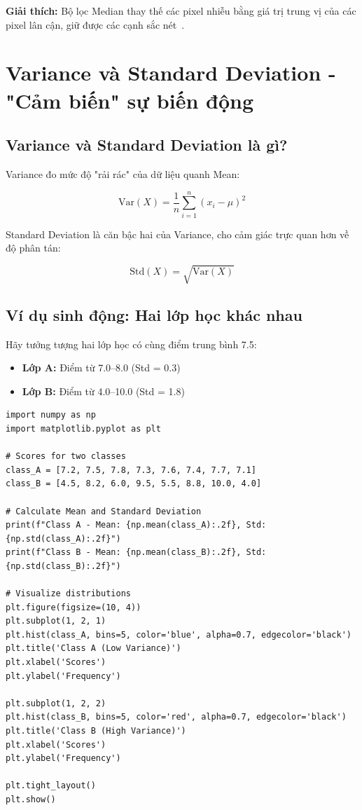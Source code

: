 \textbf{Giải thích:} Bộ lọc Median thay thế các pixel nhiễu bằng giá trị trung vị của các pixel lân cận, giữ được các cạnh sắc nét~\cite{tutorialspoint2025}.

\section{Variance và Standard Deviation - "Cảm biến" sự biến động}

\subsection{Variance và Standard Deviation là gì?}

Variance đo mức độ "rải rác" của dữ liệu quanh Mean:

\[
\text{Var}(X) = \frac{1}{n}\sum_{i=1}^{n}(x_i - \mu)^2
\]

Standard Deviation là căn bậc hai của Variance, cho cảm giác trực quan hơn về độ phân tán:

\[
\text{Std}(X) = \sqrt{\text{Var}(X)}
\]

\subsection{Ví dụ sinh động: Hai lớp học khác nhau}

Hãy tưởng tượng hai lớp học có cùng điểm trung bình 7.5:

\begin{itemize}
\item \textbf{Lớp A:} Điểm từ 7.0–8.0 (Std = 0.3)
\item \textbf{Lớp B:} Điểm từ 4.0–10.0 (Std = 1.8)
\end{itemize}

\begin{lstlisting}[caption={Comparing Variance between two classes},label={lst:variance}]
import numpy as np
import matplotlib.pyplot as plt

# Scores for two classes
class_A = [7.2, 7.5, 7.8, 7.3, 7.6, 7.4, 7.7, 7.1]
class_B = [4.5, 8.2, 6.0, 9.5, 5.5, 8.8, 10.0, 4.0]

# Calculate Mean and Standard Deviation
print(f"Class A - Mean: {np.mean(class_A):.2f}, Std: {np.std(class_A):.2f}")
print(f"Class B - Mean: {np.mean(class_B):.2f}, Std: {np.std(class_B):.2f}")

# Visualize distributions
plt.figure(figsize=(10, 4))
plt.subplot(1, 2, 1)
plt.hist(class_A, bins=5, color='blue', alpha=0.7, edgecolor='black')
plt.title('Class A (Low Variance)')
plt.xlabel('Scores')
plt.ylabel('Frequency')

plt.subplot(1, 2, 2)
plt.hist(class_B, bins=5, color='red', alpha=0.7, edgecolor='black')
plt.title('Class B (High Variance)')
plt.xlabel('Scores')
plt.ylabel('Frequency')

plt.tight_layout()
plt.show()
\end{lstlisting}

